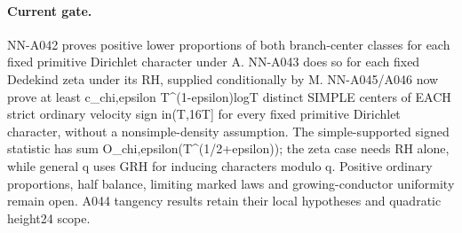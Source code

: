 \paragraph{Current gate.} NN-A042 proves positive lower proportions of both branch-center classes for each fixed primitive Dirichlet character under A. NN-A043 does so for each fixed Dedekind zeta under its RH, supplied conditionally by M. NN-A045/A046 now prove at least c\_chi,epsilon T\textasciicircum{}(1-epsilon)logT distinct SIMPLE centers of EACH strict ordinary velocity sign in(T,16T] for every fixed primitive Dirichlet character, without a nonsimple-density assumption. The simple-supported signed statistic has sum O\_chi,epsilon(T\textasciicircum{}(1/2+epsilon)); the zeta case needs RH alone, while general q uses GRH for inducing characters modulo q. Positive ordinary proportions, half balance, limiting marked laws and growing-conductor uniformity remain open. A044 tangency results retain their local hypotheses and quadratic height24 scope.
